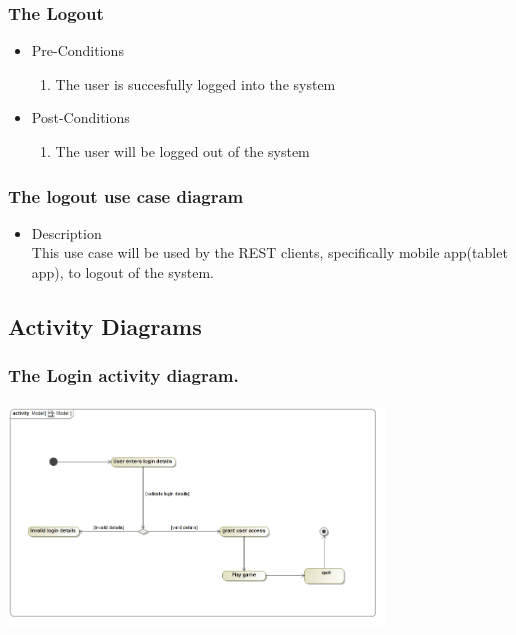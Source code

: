 \documentclass[english]{article}
\begin{document}
				\subsubsection{The Logout}
		\begin{itemize}
	
		
		\item Pre-Conditions
			\begin{enumerate}
				\item The user is succesfully logged into the system 
			
			\end{enumerate}
		\item Post-Conditions
			\begin{enumerate}
			\item The user will be logged out of the system
						
			\end{enumerate}
	

\end{itemize}

		\subsubsection* {The logout use case diagram}
		\begin{itemize}
			\item Description\\
			This use case will be used by the REST clients, specifically mobile app(tablet app), to logout of the system.
		\end{itemize}
		
	
		
	
		
		\subsection{Activity Diagrams}		
		
		\subsubsection* {The Login activity diagram.}
		\includegraphics[width=10cm,height=6cm,keepaspectratio]{Model.jpg}		
		
\end{document}
